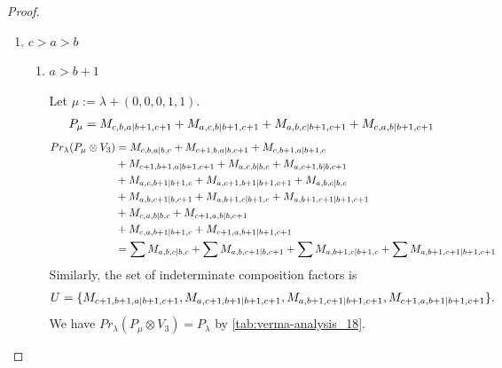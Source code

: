 \begin{proof}
\begin{enumerate}
  \item $c>a>b$
    \begin{enumerate}
      \item $a>b+1$ \par
        Let $\mu:=\lambda + (0,0,0,1,1) $.
        \begin{equation}\notag
          \begin{aligned}
            P_\mu = M_{c,b,a|b+1,c+1}
+ M_{a,c,b|b+1,c+1}
+ M_{a,b,c|b+1,c+1}
+ M_{c,a,b|b+1,c+1}
          \end{aligned}
        \end{equation}
        \begin{equation}\notag
          \begin{aligned}
            Pr_{\lambda}(P_\mu \otimes V_{3}) &=
M_{c,b,a|b,c}
+ M_{c+1,b,a|b,c+1}
+ M_{c,b+1,a|b+1,c}\\
                                            &
+ M_{c+1,b+1,a|b+1,c+1}
+ M_{a,c,b|b,c}
+ M_{a,c+1,b|b,c+1}\\
                                            &
+ M_{a,c,b+1|b+1,c}
+ M_{a,c+1,b+1|b+1,c+1}
+ M_{a,b,c|b,c}\\
                                            &
+ M_{a,b,c+1|b,c+1}
+ M_{a,b+1,c|b+1,c}
+ M_{a,b+1,c+1|b+1,c+1}\\
                                            &
+ M_{c,a,b|b,c}
+ M_{c+1,a,b|b,c+1}\\
                                            &
+ M_{c,a,b+1|b+1,c}
+ M_{c+1,a,b+1|b+1,c+1} \\
                                               &=
\sum M_{a,b,c|b,c}
+ \sum M_{a,b,c+1|b,c+1}
+ \sum M_{a,b+1,c|b+1,c}
+ \sum M_{a,b+1,c+1|b+1,c+1}
          \end{aligned}
        \end{equation}
      Similarly, the set of indeterminate composition factors is 
\begin{equation}\notag
  \begin{aligned}
    U = \{
M_{c+1,b+1,a|b+1,c+1},
M_{a,c+1,b+1|b+1,c+1},
M_{a,b+1,c+1|b+1,c+1},
M_{c+1,a,b+1|b+1,c+1}
\}.
  \end{aligned}
\end{equation}
       We have $Pr_{\lambda}(P_\mu \otimes V_{3}) = P_\lambda  $ by \cref{tab:verma-analysis_18}.
\begin{table}[htbp]
\centering
\caption{Calculation of Verma modules in $\operatorname{Filt}(P_*) \setminus \operatorname{Filt}(\prl(P_\lambda \otimes V_{3})) $ } \label{tab:verma-analysis_18}

\end{table}
\end{enumerate}
\end{enumerate}
\end{proof}
